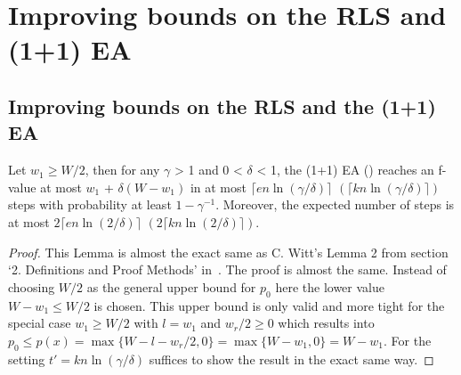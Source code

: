 \chapter{Improving bounds on the RLS and (1+1) EA}\label{ch:Content1}

\section{Improving bounds on the RLS and the (1+1) EA}

\begin{lemma}\label{lemma:CWittRefined}
    Let $w_1\ge W/2$, then for any $\gamma$ > 1 and 0 < $\delta$ < 1, the (1+1) EA (\RLSR[k]) reaches an f-value at most $w_1$ + $\delta(W-w_1)$ in at most $\lceil en\ln(\gamma/\delta)\rceil$ $(\lceil kn\ln(\gamma/\delta)\rceil)$ steps with probability at least $1-\gamma^{-1}$. Moreover, the expected number of steps is at most $2\lceil en\ln(2/\delta)\rceil$ $(2\lceil kn\ln(2/\delta)\rceil)$.
\end{lemma}
\begin{proof}
    This Lemma is almost the exact same as C. Witt's  Lemma 2 from section `2. Definitions and Proof Methods' in~\cite{witt2005worst}.
    The proof is almost the same.
    Instead of choosing $W/2$ as the general upper bound for $p_0$ here the lower value $W-w_1\le W/2$ is chosen.
    This upper bound is only valid and more tight for the special case $w_1\ge W/2$ with $l=w_1$ and $w_r/2\ge0$ which results into \(p_0\le p(x)=\max\{W-l-w_r/2,0\}=\max\{W-w_1,0\}=W-w_1\).
    For the \RLSR[k] setting $t'=kn\ln(\gamma/\delta)$ suffices to show the result in the exact same way.
\end{proof}

